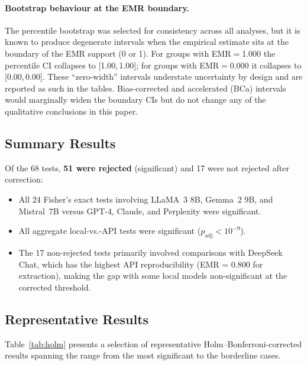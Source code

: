 \documentclass[11pt]{article}
\begin{document}
\paragraph{Bootstrap behaviour at the EMR boundary.}\label{par:bootstrap-boundary}
The percentile bootstrap was selected for consistency across all analyses, but it is known to produce degenerate intervals when the empirical estimate sits at the boundary of the EMR support (0 or 1). For groups with EMR${=}$1.000 the percentile CI collapses to [1.00,\,1.00]; for groups with EMR${=}$0.000 it collapses to [0.00,\,0.00]. These ``zero-width'' intervals understate uncertainty by design and are reported as such in the tables. Bias-corrected and accelerated (BCa) intervals would marginally widen the boundary CIs but do not change any of the qualitative conclusions in this paper.

\subsection{Summary Results}

Of the 68 tests, \textbf{51 were rejected} (significant) and 17 were not rejected after correction:

\begin{itemize}[noitemsep]
    \item All 24 Fisher's exact tests involving LLaMA~3 8B, Gemma~2 9B, and Mistral~7B versus GPT-4, Claude, and Perplexity were significant.
    \item All aggregate local-vs.-API tests were significant ($p_{\text{adj}} < 10^{-9}$).
    \item The 17 non-rejected tests primarily involved comparisons with DeepSeek Chat, which has the highest API reproducibility (EMR = 0.800 for extraction), making the gap with some local models non-significant at the corrected threshold.
\end{itemize}

\subsection{Representative Results}

Table~\ref{tab:holm} presents a selection of representative Holm--Bonferroni-corrected results spanning the range from the most significant to the borderline cases.
\end{document}
